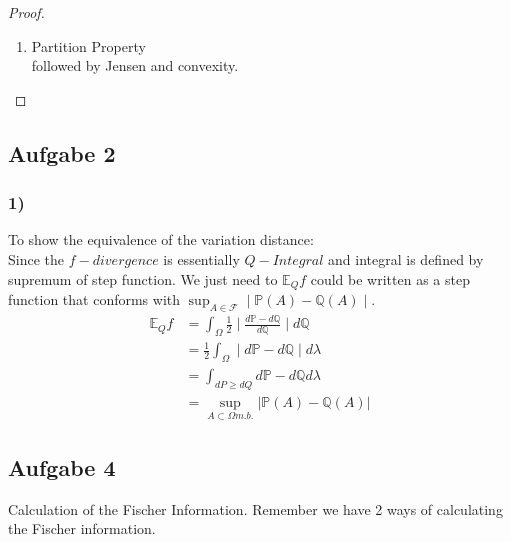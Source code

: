 \documentclass[a4paper,11pt]{article}
\theoremstyle{definition}
\theoremstyle{remark}
\begin{document}
\begin{proof}
\begin{enumerate}
\begin{itemize}
		\begin{equation*}
			J_G = (f'(\frac{x}{y}), f(\frac{e}{y}) - \frac{x}{y} - \frac{x}{y}f'(\frac{x}{y}))^\top
		\end{equation*}
		The corresponding Hessian Matrix is:
		\begin{equation*}
		H_G =
		\begin{bmatrix}
			\frac{1}{y}f''(\frac{x}{y}) & xf''(\frac{x}{y})\\
			\frac{x}{y^2}f''(\frac{x}{y}) & \frac{x^2}{y^3}f''(\frac{x}{y})
		\end{bmatrix}
		\end{equation*}
		Therefore $\det_{H_G} \geq 0$
	\end{itemize}
	\item Partition Property\\
		followed by Jensen and convexity.	
\end{enumerate}
\end{proof}

\subsection*{Aufgabe 2}

\subsubsection*{1)}
To show the equivalence of the variation distance:\\
Since the $f-divergence$ is essentially $Q-Integral$ and integral is defined by supremum of step function. We just need to $\mathbb{E}_Q f$ could be written as a step function that conforms with $\sup_{A \in \mathcal{F}} \mid \mathbb{P}(A) - \mathbb{Q}(A) \mid$.
\begin{equation*}
\begin{aligned}
	\mathbb{E}_Q f &= \int_\Omega \frac{1}{2} \mid \frac{d\mathbb{P} - d\mathbb{Q}}{d \mathbb{Q}} \mid d\mathbb{Q}\\
	&= \frac{1}{2} \int_\Omega \mid d\mathbb{P} - d\mathbb{Q} \mid d \lambda\\
	&= \int_{dP \geq dQ} d\mathbb{P} - d\mathbb{Q}  d \lambda\\
	&= \sup_{A \subset \Omega m.b.} | \mathbb{P}(A) - \mathbb{Q}(A) |
\end{aligned}
\end{equation*}

\subsection*{Aufgabe 4}
Calculation of the Fischer Information. Remember we have 2 ways of calculating the Fischer information.
\end{document}
